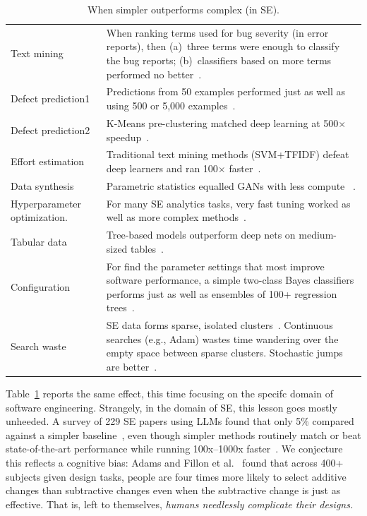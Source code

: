 \documentclass[AMA,STIX2COL]{WileyNJDv5}
\begin{document}
\begin{table}[!t]
\captionsetup[table]{font=small}
\caption{When  simpler   outperforms complex (in SE).}\label{less1}
\fontsize{8pt}{9.5pt}\selectfont
\begin{tabular}{p{2.3cm}@{:~}p{5.6cm}}\hline
Text mining & When ranking terms used for bug severity (in error reports), then (a)~three terms were enough to classify the bug reports;
(b)~classifiers based on more terms performed no better~\cite{MenziesM08}.\\
Defect prediction1 & Predictions from 50 examples
performed just as well as using 500 or 5,000 examples~\cite{menzies2008implications}.\\
Defect prediction2
  & K-Means pre-clustering matched deep learning
    at 500$\times$ speedup~\cite{majumder2018500+}. \\
    Effort estimation
  & Traditional text mining methods (SVM+TFIDF) defeat deep learners and ran
    100$\times$ faster~\cite{Tawosi23}. \\
Data synthesis
  & Parametric statistics equalled GANs with
    less compute~\cite{Ling24} .\\
Hyperparameter \newline optimization.
  & For many SE analytics tasks, very fast tuning worked as well as
    more complex methods~\cite{Fu17,agrawal2019dodge}. \\
Tabular data
  & Tree-based models outperform deep nets
    on medium-sized tables~\cite{grinsztajn2022why}. \\
Configuration & For find the parameter settings that most improve software performance, a simple two-class Bayes classifiers performs just as well as ensembles of 100+ regression trees~\cite{ganguly2025lowgodatalightse}.\\
Search waste &  SE data forms sparse, isolated clusters~\cite{ganguly2025lowgodatalightse}. 
 Continuous searches (e.g., Adam) wastes time
 wandering over the empty space between sparse clusters. Stochastic jumps are better~\cite{ganguly2025lowgodatalightse}. \\\hline
\end{tabular}
\end{table}
 Table~\ref{less1} reports the same effect, this time focusing on the specifc domain of software engineering. 
  Strangely, in the domain of SE,   this lesson goes mostly unheeded. A survey of 229 SE papers using LLMs found that only 5\% compared against a simpler baseline~\cite{Hou24},  even though simpler methods routinely match or beat state-of-the-art performance while running 100x–1000x faster~\cite{majumder2018500+,ganguly2025lowgodatalightse,grinsztajn2022why,Tawosi23,Ling24,Fu17}. We conjecture this reflects a cognitive bias: Adams and Fillon et al.~\cite{adams2021people,Fillon25} found that across 400+ subjects given design tasks, people are four times more likely to select additive changes than
   subtractive changes even when the subtractive change is just as effective. That is, left to themselves,
{\em humans needlessly complicate their designs.}
\end{document}
